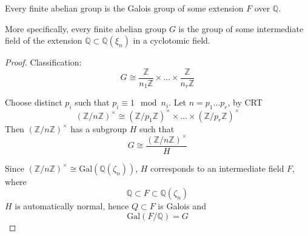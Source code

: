 \documentclass[openany]{book}
\newcommand{\Z}{\mathbb{Z}}
\newcommand{\Q}{\mathbb{Q}}
\newcommand{\gal}{\text{Gal}}
\begin{document}
\begin{thm}
    Every finite abelian group is the Galois group of some extension $F$ over $\Q$. 

    More specifically, every finite abelian group $G$ is the group of some intermediate field of the extension $\Q\subset\Q(\xi_n)$ in a cyclotomic field.
\end{thm}
\begin{proof}
    Classification:
    \begin{equation*}
        G\cong\frac{\Z}{n_1\Z}\times\dots\times\frac{\Z}{n_r\Z}
    \end{equation*}

    Choose distinct $p_i$ such that $p_i\equiv 1\mod n_i$. Let $n=p_1\dots p_r$, by CRT 
    \begin{equation*}
        \left(\Z/n\Z\right)^\times\cong \left(\Z/p_1\Z\right)^\times\times\dots\times \left(\Z/p_r\Z\right)^\times
    \end{equation*}
    Then $\left(\Z/n\Z\right)^\times$ has a subgroup $H$ such that 
    \begin{equation*}
        G\cong\frac{\left(\Z/n\Z\right)^\times}{H}
    \end{equation*}
    

    Since $\left(\Z/n\Z\right)^\times\cong\gal(\Q(\zeta_n))$, $H$ corresponds to an intermediate field $F$, where 
    \begin{equation*}
        \Q\subset F\subset\Q(\zeta_n)
    \end{equation*}
    $H$ is automatically normal, hence $Q\subset F$ is Galois and 
    \begin{equation*}
        \gal(F/\Q)=G
    \end{equation*}
\end{proof}
\end{document}
